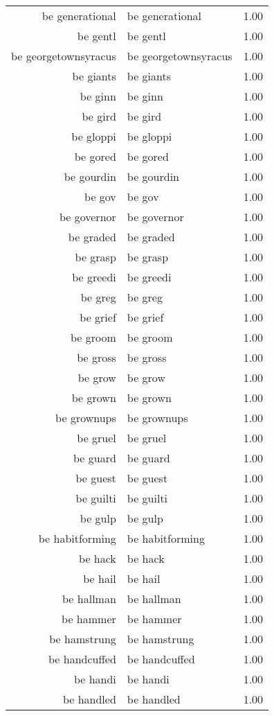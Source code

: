 \begin{table}[ht]
\begin{tabular}{rlr}
  be generational & be generational & 1.00 \\ 
  be gentl & be gentl & 1.00 \\ 
  be georgetownsyracus & be georgetownsyracus & 1.00 \\ 
  be giants & be giants & 1.00 \\ 
  be ginn & be ginn & 1.00 \\ 
  be gird & be gird & 1.00 \\ 
  be gloppi & be gloppi & 1.00 \\ 
  be gored & be gored & 1.00 \\ 
  be gourdin & be gourdin & 1.00 \\ 
  be gov & be gov & 1.00 \\ 
  be governor & be governor & 1.00 \\ 
  be graded & be graded & 1.00 \\ 
  be grasp & be grasp & 1.00 \\ 
  be greedi & be greedi & 1.00 \\ 
  be greg & be greg & 1.00 \\ 
  be grief & be grief & 1.00 \\ 
  be groom & be groom & 1.00 \\ 
  be gross & be gross & 1.00 \\ 
  be grow & be grow & 1.00 \\ 
  be grown & be grown & 1.00 \\ 
  be grownups & be grownups & 1.00 \\ 
  be gruel & be gruel & 1.00 \\ 
  be guard & be guard & 1.00 \\ 
  be guest & be guest & 1.00 \\ 
  be guilti & be guilti & 1.00 \\ 
  be gulp & be gulp & 1.00 \\ 
  be habitforming & be habitforming & 1.00 \\ 
  be hack & be hack & 1.00 \\ 
  be hail & be hail & 1.00 \\ 
  be hallman & be hallman & 1.00 \\ 
  be hammer & be hammer & 1.00 \\ 
  be hamstrung & be hamstrung & 1.00 \\ 
  be handcuffed & be handcuffed & 1.00 \\ 
  be handi & be handi & 1.00 \\ 
  be handled & be handled & 1.00 \\ 

\end{tabular}
\end{table}
